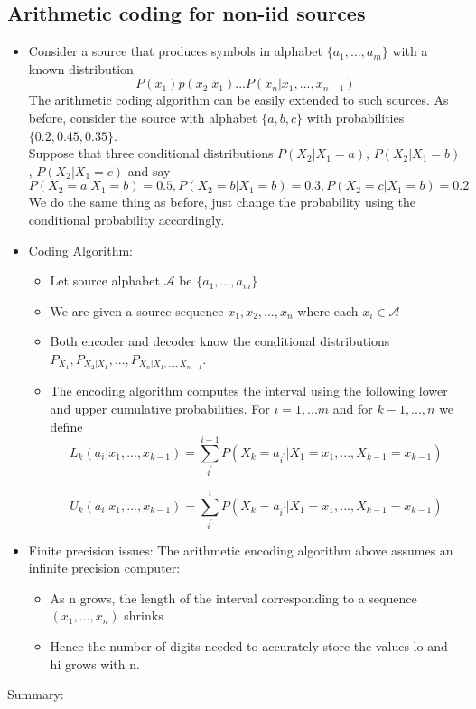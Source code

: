 \documentclass[12pt]{article}
\begin{document}
\subsection{Arithmetic coding for non-iid sources}
\begin{itemize}
\item Consider a source that produces symbols in alphabet $\{ a_1,...,a_m\}$ with a known distribution 
\[
P(x_1)p(x_2|x_1)...P(x_n|x_1,...,x_{n-1})
\]
The arithmetic coding algorithm can be easily extended to such sources. As before, consider the source with alphabet $\{a,b,c\}$ with probabilities $\{0.2,0.45,0.35\}$. \\
Suppose that three conditional distributions $P(X_2|X_1=a)$, $P(X_2|X_1=b)$, $P(X_2|X_1=c)$ and say
\[
P(X_2=a|X_1=b)=0.5 , P(X_2=b|X_1=b)=0.3, P(X_2=c|X_1=b)=0.2
\]
We do the same thing as before, just change the probability using the conditional probability accordingly.
\item Coding Algorithm:
\begin{itemize}
\item Let source alphabet $\mathcal{A}$ be $\{ a_1,...,a_m\}$
\item We are given a source sequence $x_1,x_2,...,x_n$ where each $x_i \in \mathcal{A}$
\item Both encoder and decoder know the conditional distributions $P_{X_1}, P_{X_2|X_1},...,P_{X_n|X_1,...,X_{n-1}}.$
\item The encoding algorithm computes the interval using the following lower and upper cumulative probabilities.
For $i=1,...m$ and for $k-1,...,n$ we define 
\[
L_k(a_i|x_1,...,x_{k-1}) = \sum_{i^{\prime}}^{i-1}  P(X_k=a_{i^{\prime}} | X_1=x_1,...,X_{k-1}=x_{k-1}) 
\]

\[
U_k(a_i|x_1,...,x_{k-1}) = \sum_{i^{\prime}}^{i}  P(X_k=a_{i^{\prime}} | X_1=x_1,...,X_{k-1}=x_{k-1})
\]
\end{itemize}
\item Finite precision issues:
The arithmetic encoding algorithm above assumes an infinite precision computer:
\begin{itemize}
\item As n grows, the length of the interval corresponding to a sequence $(x_1,...,x_n)$ shrinks
\item Hence the number of digits needed to accurately store the values lo and hi grows with n.
\end{itemize}
\end{itemize}
Summary:
\end{document}
